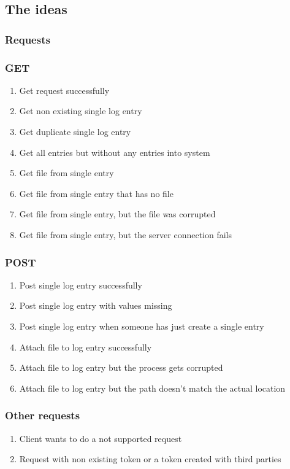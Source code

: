 \subsection{The ideas}

\subsubsection{Requests}

\subsubsection{GET}
\begin{enumerate}
\item Get request successfully
\item Get non existing single log entry
\item Get duplicate single log entry
\item Get all entries but without any entries into system
\item Get file from single entry
\item Get file from single entry that has no file
\item Get file from single entry, but the file was corrupted
\item Get file from single entry, but the server connection fails
\end{enumerate}

\subsubsection{POST}
\begin{enumerate}
\item Post single log entry successfully
\item Post single log entry with values missing
\item Post single log entry when someone has just create a single entry
\item Attach file to log entry successfully
\item Attach file to log entry but the process gets corrupted
\item Attach file to log entry but the path doesn't match the actual location
\end{enumerate}

\subsubsection{Other requests}
\begin{enumerate}
\item Client wants to do a not supported request
\item Request with non existing token or a token created with third parties

\end{enumerate}

